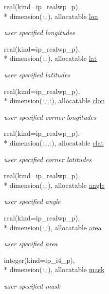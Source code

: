 \begin{DoxyCompactItemize}
real(kind=ip\+\_\+realwp\+\_\+p), \\*
dimension(\+:,\+:), allocatable \hyperlink{structmod__oasis__grid_1_1prism__grid__type_a4f7fb8a71335506209709cfbe939ef7b}{lon}
\begin{DoxyCompactList}\small\item\em user specified longitudes \end{DoxyCompactList}\item 
real(kind=ip\+\_\+realwp\+\_\+p), \\*
dimension(\+:,\+:), allocatable \hyperlink{structmod__oasis__grid_1_1prism__grid__type_aa3a8ae208948be24ac3964c9d660afed}{lat}
\begin{DoxyCompactList}\small\item\em user specified latitudes \end{DoxyCompactList}\item 
real(kind=ip\+\_\+realwp\+\_\+p), \\*
dimension(\+:,\+:,\+:), allocatable \hyperlink{structmod__oasis__grid_1_1prism__grid__type_a7aac140b1875e0ecae3a816c0cd6d45e}{clon}
\begin{DoxyCompactList}\small\item\em user specified corner longitudes \end{DoxyCompactList}\item 
real(kind=ip\+\_\+realwp\+\_\+p), \\*
dimension(\+:,\+:,\+:), allocatable \hyperlink{structmod__oasis__grid_1_1prism__grid__type_a59d5122daaab45ad6578c7cc8f4fffc8}{clat}
\begin{DoxyCompactList}\small\item\em user specified corner latitudes \end{DoxyCompactList}\item 
real(kind=ip\+\_\+realwp\+\_\+p), \\*
dimension(\+:,\+:), allocatable \hyperlink{structmod__oasis__grid_1_1prism__grid__type_a3d12bed9920fed609d83b04ab3fbc5b2}{angle}
\begin{DoxyCompactList}\small\item\em user specified angle \end{DoxyCompactList}\item 
real(kind=ip\+\_\+realwp\+\_\+p), \\*
dimension(\+:,\+:), allocatable \hyperlink{structmod__oasis__grid_1_1prism__grid__type_a7dad88f99d9648097a29b6b6f1e25d2e}{area}
\begin{DoxyCompactList}\small\item\em user specified area \end{DoxyCompactList}\item 
integer(kind=ip\+\_\+i4\+\_\+p), \\*
dimension(\+:,\+:), allocatable \hyperlink{structmod__oasis__grid_1_1prism__grid__type_ae50e83035d6214d862be48a5060887ae}{mask}
\begin{DoxyCompactList}\small\item\em user specified mask \end{DoxyCompactList}\end{DoxyCompactItemize}


